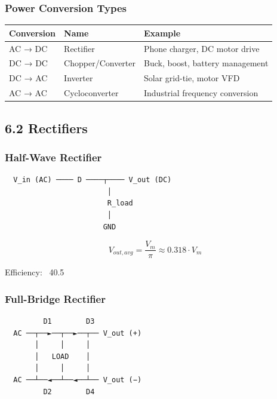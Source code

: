 \documentclass[11pt,a4paper]{book}
\begin{document}
\subsubsection{Power Conversion Types}

\begin{center}
\begin{tabular}{|l|l|l|}
\hline
Conversion & Name & Example \\
\hline
AC → DC & Rectifier & Phone charger, DC motor drive \\
DC → DC & Chopper/Converter & Buck, boost, battery management \\
DC → AC & Inverter & Solar grid-tie, motor VFD \\
AC → AC & Cycloconverter & Industrial frequency conversion \\
\hline
\end{tabular}
\end{center}

\medskip\noindent\hrulefill\medskip

\subsection{6.2 Rectifiers}

\subsubsection{Half-Wave Rectifier}

\begin{lstlisting}
  V_in (AC) ──── D ────┬──── V_out (DC)
                        │
                        R_load
                        │
                       GND
\end{lstlisting}

\[V_{out,avg} = \frac{V_m}{\pi} \approx 0.318 \cdot V_m\]

Efficiency: ~40.5%

\subsubsection{Full-Bridge Rectifier}

\begin{lstlisting}
         D1        D3
  AC ──┬──►──┬──►──┬── V_out (+)
       │     │     │
       │   LOAD    │
       │     │     │
  AC ──┴──◄──┴──◄──┴── V_out (−)
         D2        D4
\end{lstlisting}
\end{document}
